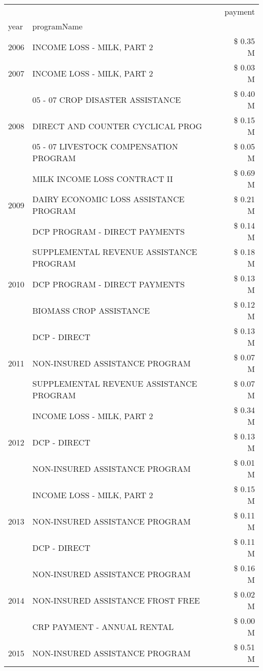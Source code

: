 \begin{tabular}{llr}
\toprule
 &  & payment \\
year & programName &  \\
\midrule
2006 & INCOME LOSS - MILK, PART 2 & \$ 0.35 M \\
\cline{1-3}
2007 & INCOME LOSS - MILK, PART 2 & \$ 0.03 M \\
\cline{1-3}
\multirow[t]{3}{*}{2008} & 05 - 07 CROP DISASTER ASSISTANCE & \$ 0.40 M \\
 & DIRECT AND COUNTER CYCLICAL PROG & \$ 0.15 M \\
 & 05 - 07 LIVESTOCK COMPENSATION PROGRAM & \$ 0.05 M \\
\cline{1-3}
\multirow[t]{3}{*}{2009} & MILK INCOME LOSS CONTRACT II & \$ 0.69 M \\
 & DAIRY ECONOMIC LOSS ASSISTANCE PROGRAM & \$ 0.21 M \\
 & DCP PROGRAM - DIRECT PAYMENTS & \$ 0.14 M \\
\cline{1-3}
\multirow[t]{3}{*}{2010} & SUPPLEMENTAL REVENUE ASSISTANCE PROGRAM & \$ 0.18 M \\
 & DCP PROGRAM - DIRECT PAYMENTS & \$ 0.13 M \\
 & BIOMASS CROP ASSISTANCE & \$ 0.12 M \\
\cline{1-3}
\multirow[t]{3}{*}{2011} & DCP - DIRECT & \$ 0.13 M \\
 & NON-INSURED ASSISTANCE PROGRAM & \$ 0.07 M \\
 & SUPPLEMENTAL REVENUE ASSISTANCE PROGRAM & \$ 0.07 M \\
\cline{1-3}
\multirow[t]{3}{*}{2012} & INCOME LOSS - MILK, PART 2 & \$ 0.34 M \\
 & DCP - DIRECT & \$ 0.13 M \\
 & NON-INSURED ASSISTANCE PROGRAM & \$ 0.01 M \\
\cline{1-3}
\multirow[t]{3}{*}{2013} & INCOME LOSS - MILK, PART 2 & \$ 0.15 M \\
 & NON-INSURED ASSISTANCE PROGRAM & \$ 0.11 M \\
 & DCP - DIRECT & \$ 0.11 M \\
\cline{1-3}
\multirow[t]{3}{*}{2014} & NON-INSURED ASSISTANCE PROGRAM & \$ 0.16 M \\
 & NON-INSURED ASSISTANCE FROST FREE & \$ 0.02 M \\
 & CRP PAYMENT - ANNUAL RENTAL & \$ 0.00 M \\
\cline{1-3}
\multirow[t]{3}{*}{2015} & NON-INSURED ASSISTANCE PROGRAM & \$ 0.51 M \\

\end{tabular}
